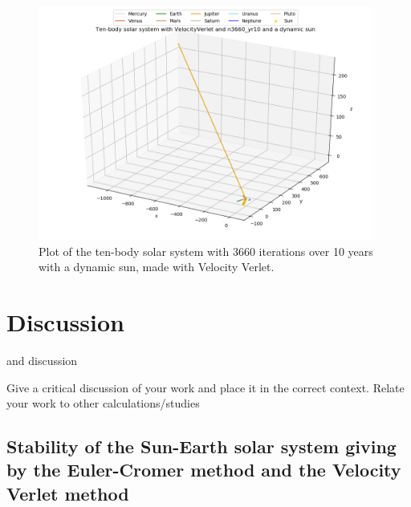 \documentclass{article}
\begin{document}
    \begin{figure}[H]
        \centering
        \includegraphics[width = 11cm]{img/plot3D_10body_V_n3660_yr10_dynamic_sun.png}
        \caption{Plot of the ten-body solar system with 3660 iterations over 10 years with a dynamic sun, made with Velocity Verlet.}
        \label{fig:plot3D_10body_V_n3660_yr10_dynamic_sun}
    \end{figure}


\vspace{1cm}

\clearpage
\newpage

\section{Discussion} \label{sec:Discussion}

 and discussion


 Give a critical discussion of your work and place it in the correct context.
 Relate your work to other calculations/studies

\subsection{Stability of the Sun-Earth solar system giving by the Euler-Cromer method and the Velocity Verlet method}    \label{sec:stabilitySE}
\end{document}
